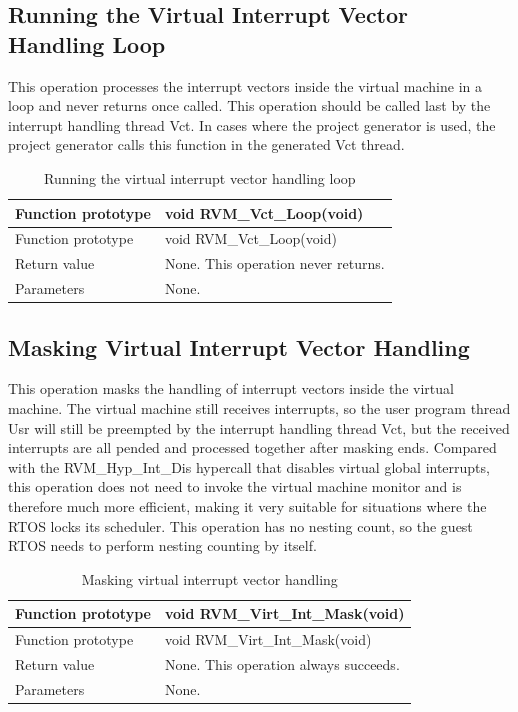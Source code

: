 \subsection{Running the Virtual Interrupt Vector Handling Loop}\label{subsec:4-5-2}

This operation processes the interrupt vectors inside the virtual machine in a loop and never returns once called. This operation should be called last by the interrupt handling thread Vct. In cases where the project generator is used, the project generator calls this function in the generated Vct thread.

\begin{xltabular}{\textwidth}{@{}>{\hsize\raggedright\arraybackslash}X>{\hsize\raggedright\arraybackslash}X@{}}
\caption{Running the virtual interrupt vector handling loop}\label{tab:4-20}\\
\toprule
Function prototype & void RVM\_\allowbreak{}Vct\_\allowbreak{}Loop(void)\tabularnewline
\endfirsthead
\toprule
Function prototype & void RVM\_\allowbreak{}Vct\_\allowbreak{}Loop(void)\tabularnewline
\midrule
\endhead
\bottomrule
\endlastfoot
Return value & None. This operation never returns.\tabularnewline
Parameters & None.\tabularnewline
\end{xltabular}

\subsection{Masking Virtual Interrupt Vector Handling}\label{subsec:4-5-3}

This operation masks the handling of interrupt vectors inside the virtual machine. The virtual machine still receives interrupts, so the user program thread Usr will still be preempted by the interrupt handling thread Vct, but the received interrupts are all pended and processed together after masking ends. Compared with the RVM\_Hyp\_Int\_Dis hypercall that disables virtual global interrupts, this operation does not need to invoke the virtual machine monitor and is therefore much more efficient, making it very suitable for situations where the RTOS locks its scheduler. This operation has no nesting count, so the guest RTOS needs to perform nesting counting by itself.

\begin{xltabular}{\textwidth}{@{}>{\hsize\raggedright\arraybackslash}X>{\hsize\raggedright\arraybackslash}X@{}}
\caption{Masking virtual interrupt vector handling}\label{tab:4-21}\\
\toprule
Function prototype & void RVM\_\allowbreak{}Virt\_\allowbreak{}Int\_\allowbreak{}Mask(void)\tabularnewline
\endfirsthead
\toprule
Function prototype & void RVM\_\allowbreak{}Virt\_\allowbreak{}Int\_\allowbreak{}Mask(void)\tabularnewline
\midrule
\endhead
\bottomrule
\endlastfoot
Return value & None. This operation always succeeds.\tabularnewline
Parameters & None.\tabularnewline
\end{xltabular}

